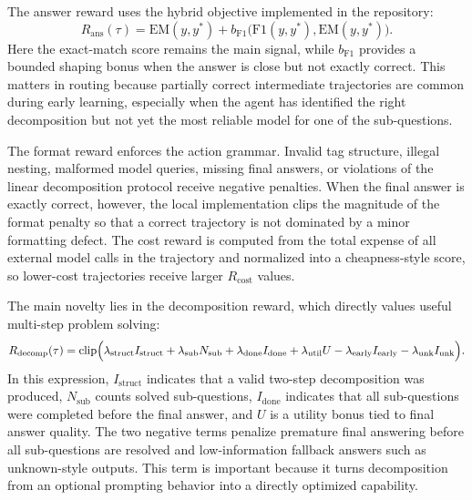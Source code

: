 \documentclass{article}
\begin{document}
The answer reward uses the hybrid objective implemented in the repository:
\begin{equation}
R_{\mathrm{ans}}(\tau) = \mathrm{EM}(y, y^*) + b_{\mathrm{F1}}\bigl(\mathrm{F1}(y, y^*), \mathrm{EM}(y, y^*)\bigr).
\label{eq:reward_answer}
\end{equation}
Here the exact-match score remains the main signal, while $b_{\mathrm{F1}}$ provides a bounded shaping bonus when the answer is close but not exactly correct. This matters in routing because partially correct intermediate trajectories are common during early learning, especially when the agent has identified the right decomposition but not yet the most reliable model for one of the sub-questions.

The format reward enforces the action grammar. Invalid tag structure, illegal nesting, malformed model queries, missing final answers, or violations of the linear decomposition protocol receive negative penalties. When the final answer is exactly correct, however, the local implementation clips the magnitude of the format penalty so that a correct trajectory is not dominated by a minor formatting defect. The cost reward is computed from the total expense of all external model calls in the trajectory and normalized into a cheapness-style score, so lower-cost trajectories receive larger $R_{\mathrm{cost}}$ values.

The main novelty lies in the decomposition reward, which directly values useful multi-step problem solving:
\begin{equation}
R_{\mathrm{decomp}}(\tau) = \mathrm{clip}\Bigl(
\lambda_{\mathrm{struct}} I_{\mathrm{struct}}
+ \lambda_{\mathrm{sub}} N_{\mathrm{sub}}
+ \lambda_{\mathrm{done}} I_{\mathrm{done}}
+ \lambda_{\mathrm{util}} U
- \lambda_{\mathrm{early}} I_{\mathrm{early}}
- \lambda_{\mathrm{unk}} I_{\mathrm{unk}}
\Bigr).
\label{eq:reward_decomp}
\end{equation}
In this expression, $I_{\mathrm{struct}}$ indicates that a valid two-step decomposition was produced, $N_{\mathrm{sub}}$ counts solved sub-questions, $I_{\mathrm{done}}$ indicates that all sub-questions were completed before the final answer, and $U$ is a utility bonus tied to final answer quality. The two negative terms penalize premature final answering before all sub-questions are resolved and low-information fallback answers such as unknown-style outputs. This term is important because it turns decomposition from an optional prompting behavior into a directly optimized capability.
\end{document}
